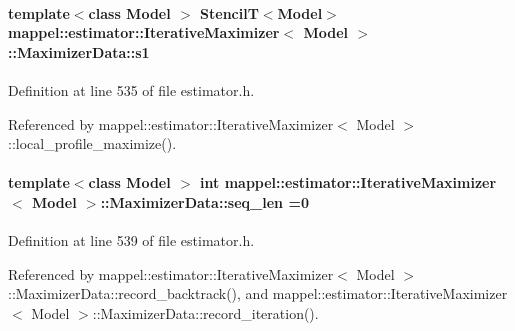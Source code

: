 \paragraph[{\texorpdfstring{s1}{s1}}]{\setlength{\rightskip}{0pt plus 5cm}template$<$class Model $>$ {\bf StencilT}$<$Model$>$ {\bf mappel\+::estimator\+::\+Iterative\+Maximizer}$<$ Model $>$\+::Maximizer\+Data\+::s1\hspace{0.3cm}{\ttfamily [protected]}}\hypertarget{classmappel_1_1estimator_1_1IterativeMaximizer_1_1MaximizerData_afbda1c2de786b3784fb278c4fbd56c3f}{}\label{classmappel_1_1estimator_1_1IterativeMaximizer_1_1MaximizerData_afbda1c2de786b3784fb278c4fbd56c3f}


Definition at line 535 of file estimator.\+h.



Referenced by mappel\+::estimator\+::\+Iterative\+Maximizer$<$ Model $>$\+::local\+\_\+profile\+\_\+maximize().

\paragraph[{\texorpdfstring{seq\+\_\+len}{seq_len}}]{\setlength{\rightskip}{0pt plus 5cm}template$<$class Model $>$ int {\bf mappel\+::estimator\+::\+Iterative\+Maximizer}$<$ Model $>$\+::Maximizer\+Data\+::seq\+\_\+len =0\hspace{0.3cm}{\ttfamily [protected]}}\hypertarget{classmappel_1_1estimator_1_1IterativeMaximizer_1_1MaximizerData_a13c682174ed62ae2b55e4c22ca4ad57b}{}\label{classmappel_1_1estimator_1_1IterativeMaximizer_1_1MaximizerData_a13c682174ed62ae2b55e4c22ca4ad57b}


Definition at line 539 of file estimator.\+h.



Referenced by mappel\+::estimator\+::\+Iterative\+Maximizer$<$ Model $>$\+::\+Maximizer\+Data\+::record\+\_\+backtrack(), and mappel\+::estimator\+::\+Iterative\+Maximizer$<$ Model $>$\+::\+Maximizer\+Data\+::record\+\_\+iteration().

